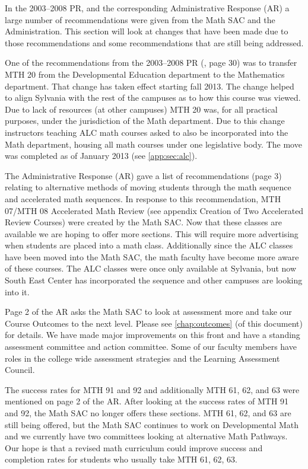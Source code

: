 In the 2003--2008 PR, and the corresponding Administrative
Response (AR) a large number of recommendations were given from the Math SAC and
the Administration.  This section will look at changes that have been made due
to those recommendations and some recommendations that are still being
addressed.

One of the recommendations from the 2003--2008 PR (\cite{mathprogramreview2003}, page 30) was to transfer MTH
20 from the Developmental Education department to the Mathematics department.
That change has taken effect starting fall 2013.  The change helped to align
Sylvania with the rest of the campuses as to how this course was viewed.   Due
to lack of resources (at other campuses) MTH 20 was, for all practical purposes,
under the jurisdiction of the Math department.  Due to this change instructors
teaching ALC math courses asked to also be incorporated into the Math
department, housing all math courses under one legislative body.  The move was
completed as of January 2013 (see \vref{app:sec:alc}).

The Administrative Response (AR) gave a list of recommendations (page 3) relating to alternative methods
of moving students through the math sequence and accelerated math sequences.  In
response to this recommendation, MTH 07/MTH 08 Accelerated Math Review (see appendix
 Creation of Two Accelerated Review Courses) were created by the Math SAC.
Now that these classes are available we are hoping to offer more sections.  This
will require more advertising when students are placed into a math class.
Additionally since the ALC classes have been moved into the Math SAC, the math
faculty have become more aware of these courses.  The ALC classes were once only
available at Sylvania, but now South East Center has incorporated the sequence
and other campuses are looking into it.

Page 2 of the AR asks the Math SAC to look at assessment more and take our
Course Outcomes to the next level.  Please see \vref{chap:outcomes} (of this
document) for
details.  We have made major improvements on this front and have a standing
assessment committee and action committee.  Some of our faculty members have
roles in the college wide assessment strategies and the Learning Assessment Council.

The success rates for MTH 91 and 92 and additionally MTH 61, 62, and 63 were
mentioned on page 2 of the AR.  After looking at the success rates of MTH 91 and
92, the Math SAC no longer offers these sections.   MTH 61, 62, and 63 are still
being offered, but the Math SAC continues to work on Developmental Math and we
currently have two committees looking at alternative Math Pathways. Our hope is that a revised math curriculum could improve success and completion rates for students who usually take MTH 61, 62, 63. 

